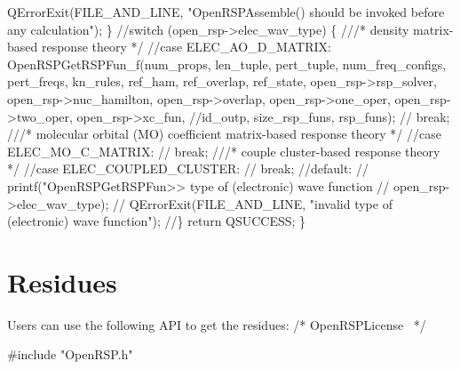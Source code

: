         QErrorExit(FILE_AND_LINE, "OpenRSPAssemble() should be invoked before any calculation");
    \}
    //switch (open_rsp->elec_wav_type) \{
    ///* density matrix-based response theory */
    //case ELEC_AO_D_MATRIX:
        OpenRSPGetRSPFun_f(num_props,
                           len_tuple,
                           pert_tuple,
                           num_freq_configs,
                           pert_freqs,
                           kn_rules,
                           ref_ham,
                           ref_overlap,
                           ref_state,
                           open_rsp->rsp_solver,
                           open_rsp->nuc_hamilton,
                           open_rsp->overlap,
                           open_rsp->one_oper,
                           open_rsp->two_oper,
                           open_rsp->xc_fun,
                           //id_outp,
                           size_rsp_funs,
                           rsp_funs);
    //    break;
    ///* molecular orbital (MO) coefficient matrix-based response theory */
    //case ELEC_MO_C_MATRIX:
    //    break;
    ///* couple cluster-based response theory */
    //case ELEC_COUPLED_CLUSTER:
    //    break;
    //default:
    //    printf("OpenRSPGetRSPFun>> type of (electronic) wave function %
    //           open_rsp->elec_wav_type);
    //    QErrorExit(FILE_AND_LINE, "invalid type of (electronic) wave function");
    //\}
    return QSUCCESS;
\}

\nwendcode{}\section{Residues}
\label{section-OpenRSP-residues}

Users can use the following API to get the residues:
\nwenddocs{}\endmoddef
/*
  \LA{}OpenRSPLicense~{\nwtagstyle{}}\RA{}
*/

#include "OpenRSP.h"


